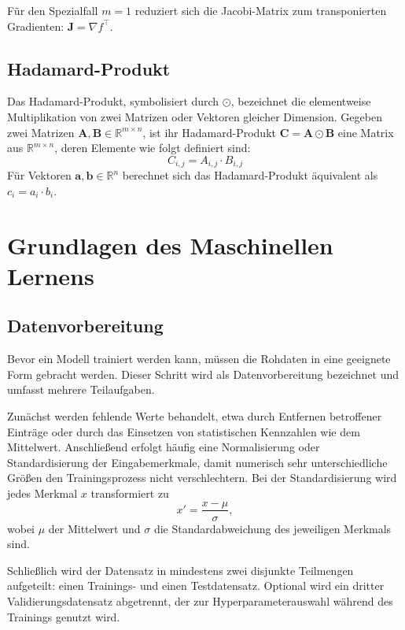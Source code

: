 Für den Spezialfall $m = 1$ reduziert sich die Jacobi-Matrix zum transponierten Gradienten:
$\mathbf{J} = \nabla f^\top$.

\subsection{Hadamard-Produkt}

Das Hadamard-Produkt, symbolisiert durch $\odot$, bezeichnet die elementweise Multiplikation von zwei Matrizen oder Vektoren gleicher Dimension.
Gegeben zwei Matrizen $\mathbf{A}, \mathbf{B} \in \mathbb{R}^{m \times n}$, ist ihr Hadamard-Produkt $\mathbf{C} = \mathbf{A} \odot \mathbf{B}$ eine Matrix aus $\mathbb{R}^{m \times n}$, deren Elemente wie folgt definiert sind:
\begin{equation}
    C_{i,j} = A_{i,j} \cdot B_{i,j}
\end{equation}
Für Vektoren $\mathbf{a}, \mathbf{b} \in \mathbb{R}^n$ berechnet sich das Hadamard-Produkt äquivalent als $c_i = a_i \cdot b_i$.


\section{Grundlagen des Maschinellen Lernens}

\subsection{Datenvorbereitung}

Bevor ein Modell trainiert werden kann, müssen die Rohdaten in eine geeignete Form gebracht werden.
Dieser Schritt wird als Datenvorbereitung bezeichnet und umfasst mehrere Teilaufgaben.

Zunächst werden fehlende Werte behandelt, etwa durch Entfernen betroffener Einträge oder durch
das Einsetzen von statistischen Kennzahlen wie dem Mittelwert.
Anschließend erfolgt häufig eine Normalisierung oder Standardisierung der Eingabemerkmale,
damit numerisch sehr unterschiedliche Größen den Trainingsprozess nicht verschlechtern.
Bei der Standardisierung wird jedes Merkmal $x$ transformiert zu
\begin{equation}
    x' = \frac{x - \mu}{\sigma},
\end{equation}
wobei $\mu$ der Mittelwert und $\sigma$ die Standardabweichung des jeweiligen Merkmals sind.

Schließlich wird der Datensatz in mindestens zwei disjunkte Teilmengen aufgeteilt:
einen Trainings- und einen Testdatensatz. Optional wird ein dritter Validierungsdatensatz
abgetrennt, der zur Hyperparameterauswahl während des Trainings genutzt wird.

